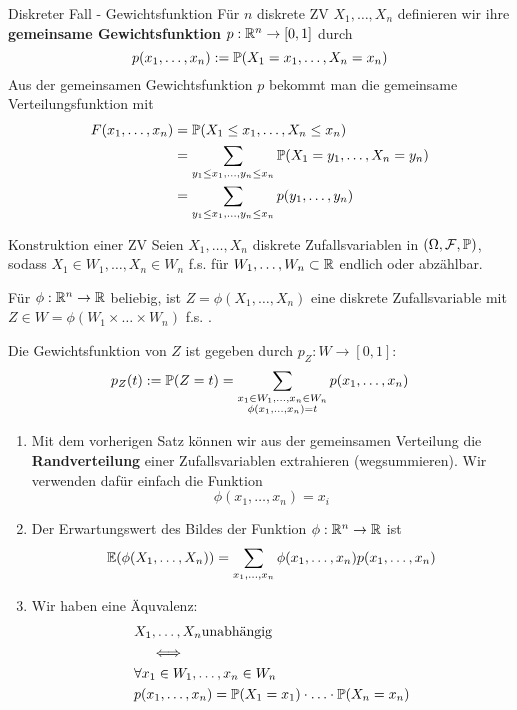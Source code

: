 \begin{mainbox}{Diskreter Fall - Gewichtsfunktion}
    Für $n$ diskrete ZV $X_1, \ldots, X_n$ definieren wir ihre \textbf{gemeinsame Gewichtsfunktion} $p: \R^n \to [0,1]$ durch
    $$p(x_1, \ldots, x_n) := \P(X_1 = x_1, \ldots, X_n = x_n)$$
    Aus der gemeinsamen Gewichtsfunktion $p$ bekommt man die gemeinsame Verteilungsfunktion mit
    \begin{align*}
        F(x_1, \ldots, x_n) &= \P(X_1 \leq x_1, \ldots, X_n \leq x_n)\\
        &= \sum_{y_1 \leq x_1, \ldots, y_n \leq x_n}\P(X_1 = y_1, \ldots, X_n = y_n)\\
        &= \sum_{y_1 \leq x_1, \ldots, y_n \leq x_n}p(y_1, \ldots,y_n)
    \end{align*}    
\end{mainbox}

\begin{subbox}{Konstruktion einer ZV}
    Seien $X_1, \ldots, X_n$ diskrete Zufallsvariablen in $(\Omega, \F, \P)$, sodass $X_1 \in W_1, \ldots, X_n \in W_n$ f.s. für $W_1, \ldots, W_n \subset \R$ endlich oder abzählbar.

    Für $\phi: \R^n \to \R$ beliebig, ist $Z = \phi(X_1, \ldots, X_n)$ eine diskrete Zufallsvariable mit $Z \in W = \phi(W_1 \times \ldots \times W_n)$ f.s. . 

    Die Gewichtsfunktion von $Z$ ist gegeben durch $p_Z: W \to [0,1]$:
    $$p_Z(t) := \P(Z = t) = \sum_{\substack{x_1 \in W_1, \ldots, x_n \in W_n\\ \phi(x_1, \ldots, x_n) = t}} p(x_1, \ldots, x_n)$$
\end{subbox}
\begin{enumerate}
    \item Mit dem vorherigen Satz können wir aus der gemeinsamen Verteilung die \textbf{Randverteilung} einer Zufallsvariablen extrahieren (wegsummieren). Wir verwenden dafür einfach die Funktion 
    $$\phi(x_1, \ldots, x_n) = x_i$$
    \item Der Erwartungswert des Bildes der Funktion $\phi: \R^n \to \R$ ist
    $$\E(\phi(X_1, \ldots, X_n)) = \sum_{x_1, \ldots, x_n}\phi(x_1, \ldots, x_n)p(x_1, \ldots, x_n)$$
    \item Wir haben eine Äquvalenz: 
    \begin{align*}
        &X_1, \ldots, X_n \text{unabhängig}\\
        &\quad \iff \\
        &\forall x_1 \in W_1, \ldots, x_n \in W_n\\
        &p(x_1, \ldots, x_n) = \P(X_1 = x_1) \cdot \ldots \cdot \P(X_n = x_n)
    \end{align*}
\end{enumerate}